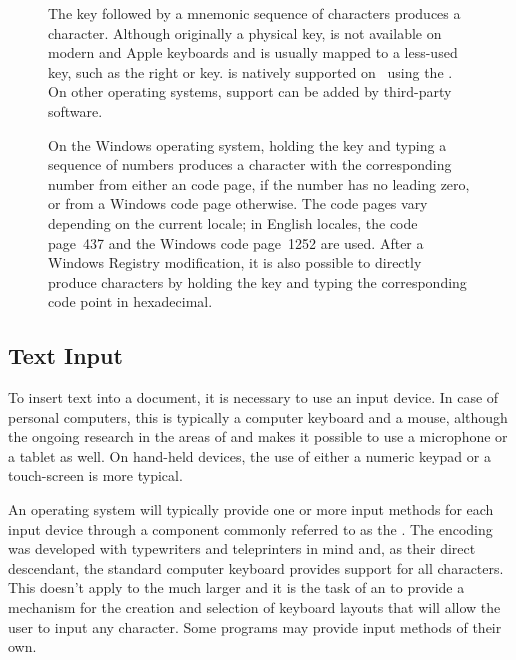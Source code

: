 \begin{figure}[p]
  
  \caption{The  key followed by
    a mnemonic sequence of  characters produces a
     character. Although originally a physical key, 
    is not available on modern  and Apple keyboards and is usually
    mapped to a less-used key, such as the right  or  key.
     is natively supported on \Unices\ using the . On other operating systems, support can be added by third-party
    software.}
\end{figure}

\begin{figure}
  
  \caption{On the Windows operating system, holding the  key and typing
    a sequence of numbers produces a character with the corresponding number
    from either an  code page, if the number has no leading zero,
    or from a Windows code page otherwise. The code pages vary depending on the
    current locale; in English locales, the  code page~437
    and the Windows code page~1252 are used. After a Windows Registry
    modification, it is also possible to directly produce 
    characters by holding the  key and typing the corresponding
     code point in hexadecimal.}
\end{figure}

\subsection{Text Input}
To insert text into a document, it is necessary to use an input device. In case
of personal computers, this is typically a computer keyboard and a mouse,
although the ongoing research in the areas of  and 
makes it possible to use a microphone or a tablet as well. On hand-held devices,
the use of either a numeric keypad or a touch-screen is more typical.

An operating system will typically provide one or more input methods for each
input device through a component commonly referred to as the . The
 encoding was developed with typewriters and teleprinters in
mind and, as their direct descendant, the standard computer keyboard provides
support for all  characters. This doesn't apply to the much
larger  and it is the task of an  to provide a
mechanism for the creation and selection of keyboard layouts that will allow the
user to input any  character. Some programs may provide input
methods of their own.


